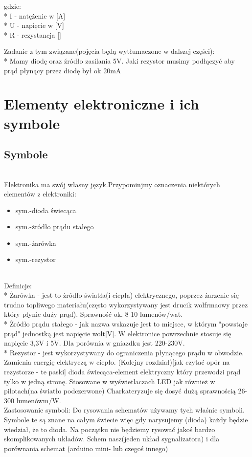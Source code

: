 \documentclass[a4paper,10pt]{report}
\begin{document}
	gdzie:\\*
	I - natężenie w [A] \\*
	U - napięcie w [V] \\*
	R - rezystancja [\Omega]
			

Zadanie z tym związane(pojęcia będą wytłumaczone w dalszej części): \\* Mamy diodę oraz źródło zasilania 5V. Jaki rezystor musimy podłączyć aby prąd płynący przez diodę był ok 20mA %
	\section{Elementy elektroniczne i ich symbole}
	\subsection {Symbole}
	\\Elektronika ma swój własny język.Przypominjmy oznaczenia niektórych elementów z elektroniki:
\begin{itemize}
	\item sym.-dioda świecąca
	\item sym.-żródło prądu stałego
	\item sym.-żarówka
	\item sym.-rezystor
\end{itemize}

   \\Definicje:
\\* Żarówka - jest to żródło światła(i ciepła) elektrycznego, poprzez żarzenie się trudno topliwego materiału(często wykorzystywany jest drucik wolfrmaowy przez który płynie duży prąd). Sprawność ok.
8-10 lumenów/wat. 
\\* Żródło prądu stałego - jak nazwa wskazuje jest to miejsce, w którym "powstaje prąd" jednostką jest napięcie wolt[V]. W elektronice powrzechnie stosuje się napięcie 3,3V i 5V. Dla porównia w gniazdku jest 220-230V.
\\* Rezystor - jest wykorzystywany do ograniczenia płynącego prądu w obwodzie. Zamienia energię elektryczą w ciepło. (Kolejny rozdział)[jak czytać opór na rezystorze - te paski]
dioda świecąca-element elektryczny który przewodzi prąd tylko w jedną stronę. Stosowane w wyświetlaczach LED jak również w pilotach(na światło podczerwone) Charkateryzuje się dosyć dużą sprawnością 
26-300 lumenówm/W.  %
    \\Zastosowanie symboli:
Do rysowania schematów używamy tych właśnie symboli. Symbole te są znane na całym świecie więc gdy narysujemy (dioda) każdy będzie wiedział, że to dioda. Na początku nie będziemy rysować jakoś bardzo skomplikowanych układów.
Schem nasz(jeden układ sygnalizatora) i dla porównania schemat (arduino mini- lub czegoś innego)
\end{document}
